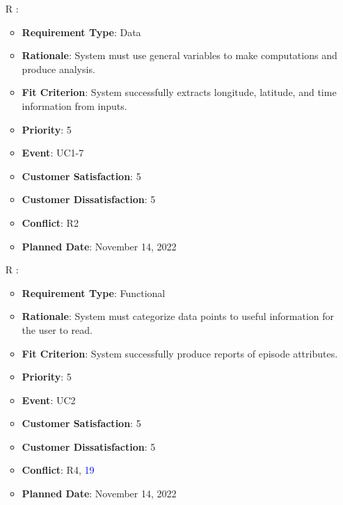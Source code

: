 \documentclass[12pt, titlepage]{article}
\newcounter{reqnum} %
\begin{document}
\begin{itemize}
\item[R\refstepcounter{reqnum}\thereqnum
\label{R_Inputs_2}:] 
\begin{itemize}
    \item \textbf{Requirement Type}: Data
    \item \textbf{Rationale}: System must use general variables to make computations and produce analysis.
    \item \textbf{Fit Criterion}: System successfully extracts longitude, latitude, and time information from inputs.
    \item \textbf{Priority}: 5
    \item \textbf{Event}: UC1-7
    \item \textbf{Customer Satisfaction}: 5
    \item \textbf{Customer Dissatisfaction}: 5
    \item \textbf{Conflict}: R2
    \item \textbf{Planned Date}: November 14, 2022
\end{itemize}

\item[R\refstepcounter{reqnum}\thereqnum
\label{R_Outputs_1}:] 
\begin{itemize}
    \item \textbf{Requirement Type}: Functional
    \item \textbf{Rationale}: System must categorize data points to useful information for the user to read.
    \item \textbf{Fit Criterion}: System successfully produce reports of episode attributes. 
    \item \textbf{Priority}: 5
    \item \textbf{Event}: UC2
    \item \textbf{Customer Satisfaction}: 5
    \item \textbf{Customer Dissatisfaction}: 5
    \item \textbf{Conflict}: R4, \textcolor{blue}{19}
    \item \textbf{Planned Date}: November 14, 2022
\end{itemize}


\end{itemize}
\end{document}

